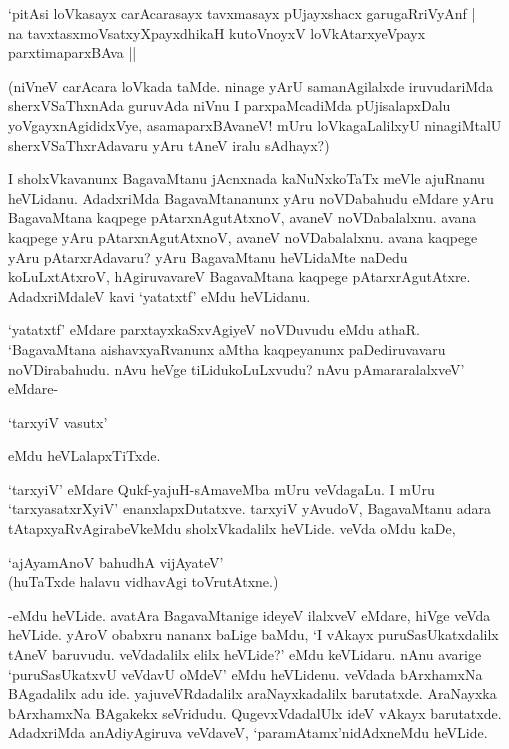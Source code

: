 \begin{shloka}
`pitA\s si loVkasayx carAcarasayx tavxmasayx pUjayxshacx garugaRriVyAnf |\\
na tavxtasxmoV\s satxyXpayxdhikaH kutoV\s noyxV loVkAtarxyeV\s payx\\
\hspace{5.3cm} parxtimaparxBAva ||
\end{shloka}

(niVneV carAcara loVkada taMde. ninage yArU samanAgilalxde iruvudariMda sherxVSaThxnAda guruvAda niVnu I parxpaMcadiMda pUjisalapxDalu yoVgayxnAgididxVye, asamaparxBAvaneV! mUru loVkagaLalilxyU ninagiMtalU sherxVSaThxrAdavaru yAru tAneV iralu sAdhayx?)

I sholxVkavanunx BagavaMtanu jAcnxnada kaNuNxkoTaTx meVle ajuRnanu heVLidanu. AdadxriMda BagavaMtananunx yAru noVDabahudu eMdare yAru BagavaMtana kaqpege pAtarxnAgutAtxnoV, avaneV noVDabalalxnu. avana kaqpege yAru pAtarxnAgutAtxnoV, avaneV noVDabalalxnu. avana kaqpege yAru pAtarxrAdavaru? yAru BagavaMtanu heVLidaMte naDedu koLuLxtAtxroV, hAgiruvavareV BagavaMtana kaqpege pAtarxrAgutAtxre. AdadxriMdaleV kavi `yatatxtf' eMdu heVLidanu.

`yatatxtf' eMdare parxtayxkaSxvAgiyeV noVDuvudu eMdu athaR. `BagavaMtana aishavxyaRvanunx aMtha kaqpeyanunx paDediruvavaru noVDirabahudu. nAvu heVge tiLidukoLuLxvudu? nAvu pAmararalalxveV' eMdare-

\begin{shloka}
`tarxyiV vasutx'
\end{shloka}

eMdu heVLalapxTiTxde.

`tarxyiV' eMdare Qukf-yajuH-sAmaveMba mUru veVdagaLu. I mUru `tarxyasatxrXyiV' enanxlapxDutatxve. tarxyiV yAvudoV, BagavaMtanu adara tAtapxyaRvAgirabeVkeMdu sholxVkadalilx heVLide. veVda oMdu kaDe,

\begin{shloka}
`ajAyamAnoV bahudhA vijAyateV'\\
(huTaTxde halavu vidhavAgi toVrutAtxne.)
\end{shloka}

-eMdu heVLide. avatAra BagavaMtanige ideyeV ilalxveV eMdare, hiVge veVda heVLide. yAroV obabxru nananx baLige baMdu, `I vAkayx puruSasUkatxdalilx tAneV baruvudu. veVdadalilx elilx heVLide?' eMdu keVLidaru. nAnu avarige `puruSasUkatxvU veVdavU oMdeV' eMdu heVLidenu. veVdada bArxhamxNa BAgadalilx adu ide. yajuveVRdadalilx araNayxkadalilx barutatxde. AraNayxka bArxhamxNa BAgakekx seVridudu. QugevxVdadalUlx ideV vAkayx barutatxde. AdadxriMda anAdiyAgiruva veVdaveV, `paramAtamx'nidAdxneMdu heVLide.

